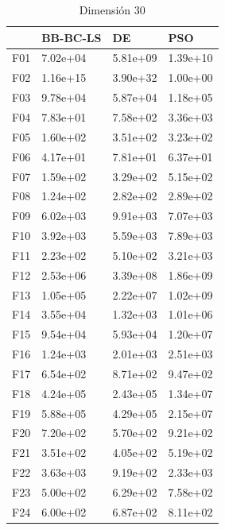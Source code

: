 \begin{table}[H]
\begin{minipage}{.5\linewidth}
    \end{minipage}%
    \begin{minipage}{.5\linewidth}
      \centering
        \caption{Dimensión 30}
        \begin{tabular}{llll}
            \toprule
            {} &  BB-BC-LS &        DE &       PSO \\
            \midrule
            F01  &  7.02e+04 &  5.81e+09 &  1.39e+10 \\
            F02  &  1.16e+15 &  3.90e+32 &  1.00e+00 \\
            F03  &  9.78e+04 &  5.87e+04 &  1.18e+05 \\
            F04  &  7.83e+01 &  7.58e+02 &  3.36e+03 \\
            F05  &  1.60e+02 &  3.51e+02 &  3.23e+02 \\
            F06  &  4.17e+01 &  7.81e+01 &  6.37e+01 \\
            F07  &  1.59e+02 &  3.29e+02 &  5.15e+02 \\
            F08  &  1.24e+02 &  2.82e+02 &  2.89e+02 \\
            F09  &  6.02e+03 &  9.91e+03 &  7.07e+03 \\
            F10  &  3.92e+03 &  5.59e+03 &  7.89e+03 \\
            F11  &  2.23e+02 &  5.10e+02 &  3.21e+03 \\
            F12  &  2.53e+06 &  3.39e+08 &  1.86e+09 \\
            F13  &  1.05e+05 &  2.22e+07 &  1.02e+09 \\
            F14  &  3.55e+04 &  1.32e+03 &  1.01e+06 \\
            F15  &  9.54e+04 &  5.93e+04 &  1.20e+07 \\
            F16  &  1.24e+03 &  2.01e+03 &  2.51e+03 \\
            F17  &  6.54e+02 &  8.71e+02 &  9.47e+02 \\
            F18  &  4.24e+05 &  2.43e+05 &  1.34e+07 \\
            F19  &  5.88e+05 &  4.29e+05 &  2.15e+07 \\
            F20  &  7.20e+02 &  5.70e+02 &  9.21e+02 \\
            F21  &  3.51e+02 &  4.05e+02 &  5.19e+02 \\
            F22  &  3.63e+03 &  9.19e+02 &  2.33e+03 \\
            F23  &  5.00e+02 &  6.29e+02 &  7.58e+02 \\
            F24  &  6.00e+02 &  6.87e+02 &  8.11e+02 \\

\end{tabular}
\end{minipage}
\end{table}
